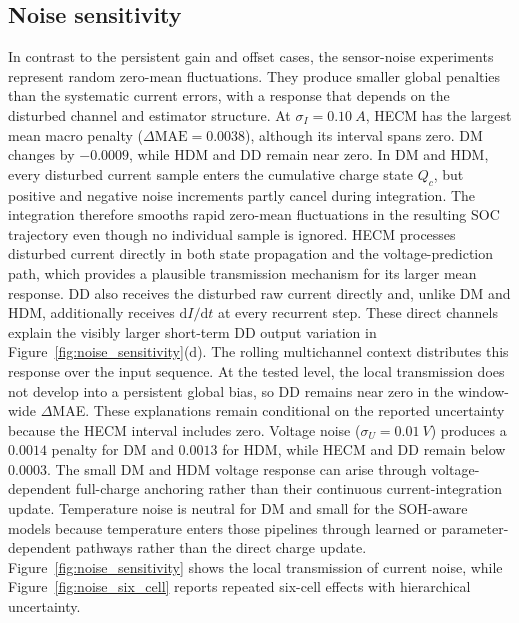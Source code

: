 \documentclass[review,nopreprintline]{elsarticle}
\begin{document}
\subsection{Noise sensitivity}
In contrast to the persistent gain and offset cases, the sensor-noise experiments represent random zero-mean fluctuations. They produce smaller global penalties than the systematic current errors, with a response that depends on the disturbed channel and estimator structure. At $\sigma_I=\SI{0.10}{A}$, HECM has the largest mean macro penalty ($\Delta\mathrm{MAE}=0.0038$), although its interval spans zero. DM changes by $-0.0009$, while HDM and DD remain near zero. In DM and HDM, every disturbed current sample enters the cumulative charge state $Q_c$, but positive and negative noise increments partly cancel during integration. The integration therefore smooths rapid zero-mean fluctuations in the resulting SOC trajectory even though no individual sample is ignored. HECM processes disturbed current directly in both state propagation and the voltage-prediction path, which provides a plausible transmission mechanism for its larger mean response. DD also receives the disturbed raw current directly and, unlike DM and HDM, additionally receives $\mathrm{d}I/\mathrm{d}t$ at every recurrent step. These direct channels explain the visibly larger short-term DD output variation in Figure~\ref{fig:noise_sensitivity}(d). The rolling multichannel context distributes this response over the input sequence. At the tested level, the local transmission does not develop into a persistent global bias, so DD remains near zero in the window-wide $\Delta$MAE. These explanations remain conditional on the reported uncertainty because the HECM interval includes zero. Voltage noise ($\sigma_U=\SI{0.01}{V}$) produces a $0.0014$ penalty for DM and $0.0013$ for HDM, while HECM and DD remain below $0.0003$. The small DM and HDM voltage response can arise through voltage-dependent full-charge anchoring rather than their continuous current-integration update. Temperature noise is neutral for DM and small for the SOH-aware models because temperature enters those pipelines through learned or parameter-dependent pathways rather than the direct charge update. Figure~\ref{fig:noise_sensitivity} shows the local transmission of current noise, while Figure~\ref{fig:noise_six_cell} reports repeated six-cell effects with hierarchical uncertainty.
\end{document}
